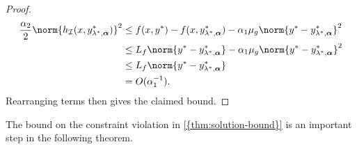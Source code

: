 \begin{proof}
\begin{align*}
    \frac{\alpha_2}{2} \norm{h_\mathcal{I}(x,y_{\lambda^*,\boldsymbol{\alpha}}^*)}^2 & \leq f(x,y^*) - f(x,y_{\lambda^*,\boldsymbol{\alpha}}^*) - \alpha_1 \mu_g \norm{y^* - y_{\lambda^*,\boldsymbol{\alpha}}^*}^2 \\
    & \leq L_f \norm{y^* - y_{\lambda^*,\boldsymbol{\alpha}}^*} - \alpha_1 \mu_g \norm{y^* - y_{\lambda^*,\boldsymbol{\alpha}}^*}^2 \\
    & \leq L_f \norm{y^* - y_{\lambda^*,\boldsymbol{\alpha}}^*} \\
    & = O({\alpha_1^{-1}}). 
\end{align*}
Rearranging terms then gives the claimed bound. 
\end{proof}
The bound on the constraint violation in \cref{{thm:solution-bound}} is an important step in the following theorem.

